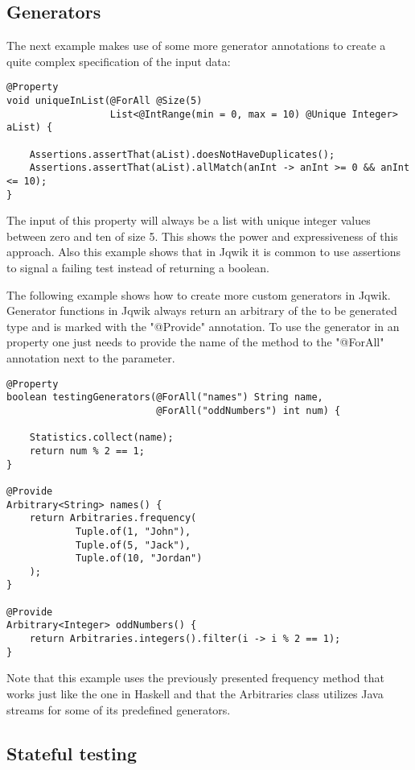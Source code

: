 \documentclass[a4paper, 12pt]{article} %
\begin{document}
\subsection{Generators}

The next example\cite{jqwikdoc} makes use of some more generator annotations to create a quite complex specification of the input data:

\begin{verbatim}
@Property
void uniqueInList(@ForAll @Size(5) 
                  List<@IntRange(min = 0, max = 10) @Unique Integer> aList) {
    
    Assertions.assertThat(aList).doesNotHaveDuplicates();
    Assertions.assertThat(aList).allMatch(anInt -> anInt >= 0 && anInt <= 10);
}
\end{verbatim}

The input of this property will always be a list with unique integer values between zero and ten of size 5. This shows the power and expressiveness of this approach. Also this example shows that in Jqwik it is common to use assertions to signal a failing test instead of returning a boolean.

The following example shows how to create more custom generators in Jqwik. Generator functions in Jqwik always return an arbitrary of the to be generated type and is marked with the "@Provide" annotation. To use the generator in an property one just needs to provide the name of the method to the "@ForAll" annotation next to the parameter\cite{jqwikdoc}.

\begin{verbatim}
@Property
boolean testingGenerators(@ForAll("names") String name, 
                          @ForAll("oddNumbers") int num) {

    Statistics.collect(name);
    return num % 2 == 1;
}

@Provide
Arbitrary<String> names() {
    return Arbitraries.frequency(
            Tuple.of(1, "John"),
            Tuple.of(5, "Jack"),
            Tuple.of(10, "Jordan")
    );
}

@Provide
Arbitrary<Integer> oddNumbers() {
    return Arbitraries.integers().filter(i -> i % 2 == 1);
}
\end{verbatim} 

Note that this example uses the previously presented frequency method that works just like the one in Haskell and that the Arbitraries class utilizes Java streams for some of its predefined generators.

\subsection{Stateful testing}
\end{document}
